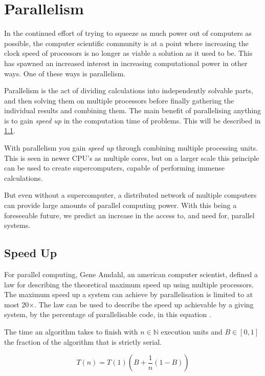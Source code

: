 \section{Parallelism}\label{sec:parallelism}

In the continued effort of trying to squeeze as much power out of computers as possible, the computer scientific community is at a point where increasing the clock speed of processors is no longer as viable a solution as it used to be. This has spawned an increased interest in increasing computational power in other ways. One of these ways is parallelism.

Parallelism is the act of dividing calculations into independently solvable parts, and then solving them on multiple processors before finally gathering the individual results and combining them. The main benefit of parallelising anything is to gain \emph{speed up} in the computation time of problems. This will be described in \cref{sup}.

With parallelism you gain \emph{speed up} through combining multiple processing units. This is seen in newer CPU's as multiple cores, but on a larger scale this principle can be used to create supercomputers, capable of performing immense calculations.

But even without a supercomputer, a distributed network of multiple computers can provide large amounts of parallel computing power. With this being a foreseeable future, we predict an increase in the access to, and need for, parallel systems.

\subsection{Speed Up}\label{sup}

For parallel computing, Gene Amdahl, an american computer scientist, defined a law for describing the theoretical maximum speed up using multiple processors. The maximum speed up a system can achieve by parallelisation is limited to at most 20×.
The law can be used to describe the speed up achievable by a giving system, by the percentage of parallelisable code, in this equation \cite{wiki_amdahl}.

The time an algorithm takes to finish with $n \in \mathbb{N}$ execution units and $B \in [0, 1]$ the fraction of the algorithm that is strictly serial.

\begin{equation}
  T(n) = T(1)(B + \frac{1}{n} (1 - B))
\end{equation}

